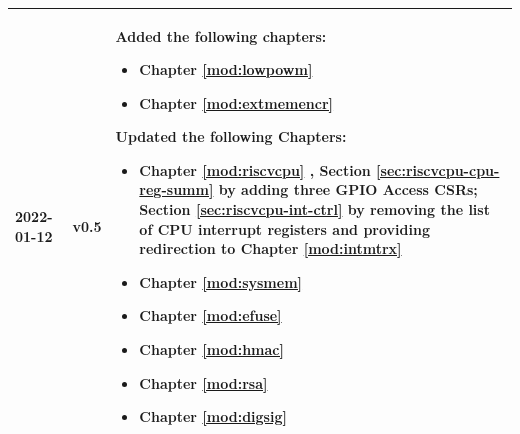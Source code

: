 \begin{longtable}[l]{ | m{2cm} | m{1.5cm} | m{12cm} | }
        2022-01-12      & v0.5 &
        Added the following chapters:
            \begin{itemize}
                \item Chapter \ref{mod:lowpowm} \textit{\nameref{mod:lowpowm}}
                \item Chapter \ref{mod:extmemencr} \textit{\nameref{mod:extmemencr}}
            \end{itemize}
        Updated the following Chapters:
            \begin{itemize}
                \item Chapter \ref{mod:riscvcpu} \textit{\nameref{mod:riscvcpu}}, Section \ref{sec:riscvcpu-cpu-reg-summ} by adding three GPIO Access CSRs; Section \ref{sec:riscvcpu-int-ctrl} by removing the list of CPU interrupt registers and providing redirection to Chapter \ref{mod:intmtrx} \textit{\nameref{mod:intmtrx}}
                \item Chapter \ref{mod:sysmem} \textit{\nameref{mod:sysmem}}
                \item Chapter \ref{mod:efuse} \textit{\nameref{mod:efuse}}
                \item Chapter \ref{mod:hmac} \textit{\nameref{mod:hmac}}
                \item Chapter \ref{mod:rsa} \textit{\nameref{mod:rsa}}
                \item Chapter \ref{mod:digsig} \textit{\nameref{mod:digsig}}
            \end{itemize} \\\hline


\end{longtable}
